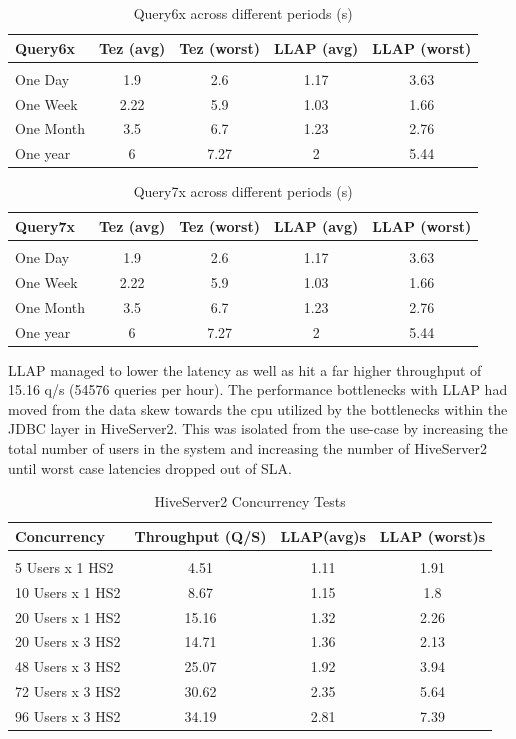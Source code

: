 \begin{table}[h]
\begin{tabular}{l|*{4}c}
Query6x  &   Tez (avg)  &   Tez (worst)  &   LLAP (avg)  &   LLAP (worst) \\
\hline \\
One Day  &   1.9  &   2.6  &   1.17  &   3.63 \\
One Week  &   2.22  &   5.9  &   1.03  &   1.66 \\
One Month  &   3.5  &   6.7  &   1.23  &   2.76 \\
One year  &   6  &   7.27  &   2  &   5.44 \\
\end{tabular}
\caption{Query6x across different periods (s)}
\end{table}

\begin{table}[h]
\begin{tabular}{l|*{4}c}
Query7x  &   Tez (avg)  &   Tez (worst)  &   LLAP (avg)  &   LLAP (worst) \\
\hline \\
One Day  &   1.9  &   2.6  &   1.17  &   3.63 \\
One Week  &   2.22  &   5.9  &   1.03  &   1.66 \\
One Month  &   3.5  &   6.7  &   1.23  &   2.76 \\
One year  &   6  &   7.27  &   2  &   5.44 \\
\end{tabular}
\caption{Query7x across different periods (s)}
\end{table}

LLAP managed to lower the latency as well as hit a far higher throughput of 15.16 q/s (54576 queries per hour). The 
performance bottlenecks with LLAP had moved from the data skew towards the cpu utilized by the bottlenecks within
the JDBC layer in HiveServer2. This was isolated from the use-case by increasing the total number of users in the system and
increasing the number of HiveServer2 until worst case latencies dropped out of SLA.

\begin{table}[H]
\begin{tabular}{l|*{3}c}
Concurrency & Throughput (Q/S) & LLAP(avg)s & LLAP (worst)s \\
\hline \\
5 Users x 1 HS2 & 4.51 & 1.11 & 1.91 \\
10 Users x 1 HS2 & 8.67 & 1.15 & 1.8 \\
20 Users x 1 HS2 & 15.16 & 1.32 & 2.26 \\
20 Users x 3 HS2 & 14.71 & 1.36 & 2.13 \\
48 Users x 3 HS2 & 25.07 & 1.92 & 3.94 \\
72 Users x 3 HS2 & 30.62 & 2.35 & 5.64 \\
96 Users x 3 HS2 & 34.19 & 2.81 & 7.39 \\
\end{tabular}
\caption{HiveServer2 Concurrency Tests}
\end{table}

